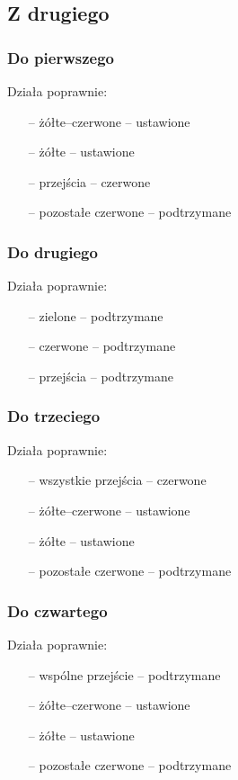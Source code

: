 \documentclass[a4paper, 12pt, titlepage]{article}
\begin{document}
		\subsection{Z drugiego}
			\subsubsection{Do pierwszego}
				Działa poprawnie:
				\begin{itemize}
					\item[--] żółte--czerwone -- ustawione
					\item[--] żółte -- ustawione
					\item[--] przejścia -- czerwone
					\item[--] pozostałe czerwone -- podtrzymane
				\end{itemize}
			\subsubsection{Do drugiego}
				Działa poprawnie:
				\begin{itemize}
					\item[--] zielone -- podtrzymane
					\item[--] czerwone -- podtrzymane
					\item[--] przejścia -- podtrzymane
				\end{itemize}
			\subsubsection{Do trzeciego}
				Działa poprawnie:
				\begin{itemize}
					\item[--] wszystkie przejścia -- czerwone
					\item[--] żółte--czerwone -- ustawione
					\item[--] żółte -- ustawione
					\item[--] pozostałe czerwone -- podtrzymane
				\end{itemize}
			\subsubsection{Do czwartego}
				Działa poprawnie:
				\begin{itemize}
					\item[--] wspólne przejście -- podtrzymane
					\item[--] żółte--czerwone -- ustawione
					\item[--] żółte -- ustawione
					\item[--] pozostałe czerwone -- podtrzymane					
				\end{itemize}
				\newpage
\end{document}
